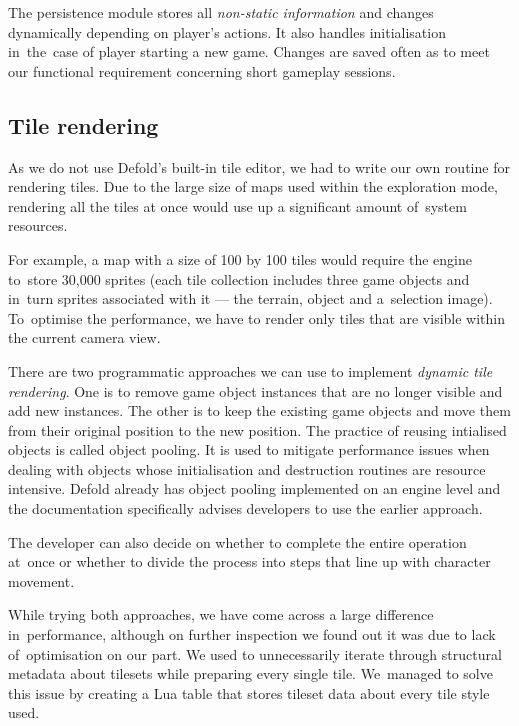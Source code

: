 \documentclass[thesis=B,english,hidelinks]{FITthesisXE}[2012/06/26]
\begin{document}
The persistence module stores all \emph{non-static information} and changes dynamically depending on player's actions. It also handles initialisation in~the~case of player starting a new game. Changes are saved often as to meet our functional requirement concerning short gameplay sessions.

\subsection{Tile rendering}

As we do not use Defold's built-in tile editor, we had to write our own routine for rendering tiles. Due to the large size of maps used within the exploration mode, rendering all the tiles at once would use up a significant amount of~system resources.

\newpage

For example, a map with a size of 100 by 100 tiles would require the engine to~store 30,000 sprites (each tile collection includes three game objects and in~turn sprites associated with it --- the terrain, object and a~selection image). To~optimise the performance, we have to render only tiles that are visible within the current camera view.

There are two programmatic approaches we can use to implement \emph{dynamic tile rendering}. One is to remove game object instances that are no longer visible and add new instances. The other is to keep the existing game objects and move them from their original position to the new position. The practice of reusing intialised objects is called object pooling. It is used to mitigate performance issues when dealing with objects whose initialisation and destruction routines are resource intensive. Defold already has object pooling implemented on an engine level and the documentation specifically advises developers to use the earlier approach\autocite{defoldpooling}.

The developer can also decide on whether to complete the entire operation at~once or whether to divide the process into steps that line up with character movement.

While trying both approaches, we have come across a large difference in~performance, although on further inspection we found out it was due to lack of~optimisation on our part. We used to unnecessarily iterate through structural metadata about tilesets while preparing every single tile. We~managed to solve this issue by creating a Lua table that stores tileset data about every tile style used.
\end{document}
